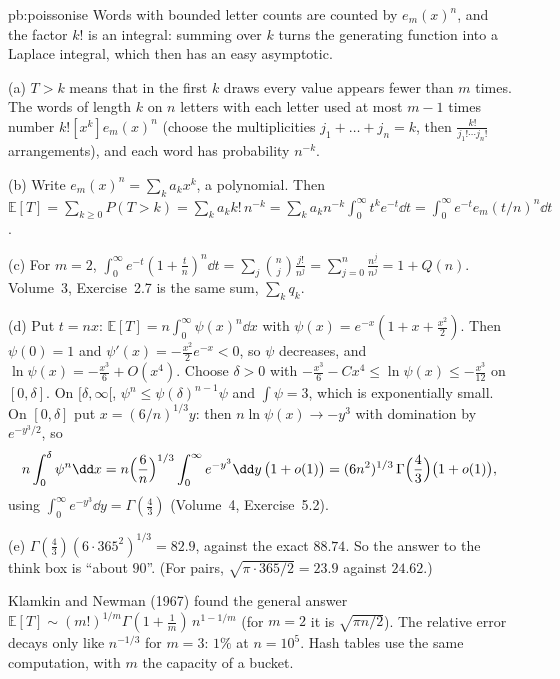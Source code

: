 \begin{solution}{pb:poissonise}
\idea Words with bounded letter counts are counted by $e_m(x)^n$, and the factor $k!$ is an integral: summing over $k$ turns the generating function into a Laplace
integral, which then has an easy asymptotic.

\writeup (a) $T>k$ means that in the first $k$ draws every value appears fewer than $m$ times. The words of length $k$ on $n$ letters with each letter used at most $m-1$
times number $k![x^k]e_m(x)^n$ (choose the multiplicities $j_1+\dots+j_n=k$, then $\frac{k!}{j_1!\cdots j_n!}$ arrangements), and each word has probability $n^{-k}$.

(b) Write $e_m(x)^n=\sum_ka_kx^k$, a polynomial. Then $\mathbb E[T]=\sum_{k\ge0}P(T>k)=\sum_ka_kk!\,n^{-k}=\sum_ka_kn^{-k}\int_0^\infty t^ke^{-t}\dd t=\int_0^\infty e^{-t}e_m(t/n)^n\dd t$.

(c) For $m=2$, $\int_0^\infty e^{-t}(1+\frac tn)^n\dd t=\sum_j\binom nj\frac{j!}{n^j}=\sum_{j=0}^n\frac{n^{\underline j}}{n^j}=1+Q(n)$. Volume~3, Exercise~2.7 is the same sum, $\sum_kq_k$.

(d) Put $t=nx$: $\mathbb E[T]=n\int_0^\infty\psi(x)^n\dd x$ with $\psi(x)=e^{-x}(1+x+\frac{x^2}2)$. Then $\psi(0)=1$ and $\psi'(x)=-\frac{x^2}2e^{-x}<0$, so $\psi$ decreases, and
$\ln\psi(x)=-\frac{x^3}6+O(x^4)$. Choose $\delta>0$ with $-\frac{x^3}6-Cx^4\le\ln\psi(x)\le-\frac{x^3}{12}$ on $[0,\delta]$. On $[\delta,\infty[$, $\psi^n\le\psi(\delta)^{n-1}\psi$ and $\int\psi=3$, which is exponentially
small. On $[0,\delta]$ put $x=(6/n)^{1/3}y$: then $n\ln\psi(x)\to-y^3$ with domination by $e^{-y^3/2}$, so
\[
n\int_0^\delta\psi^n\dd x=n\Bigl(\frac6n\Bigr)^{1/3}\int_0^\infty e^{-y^3}\dd y\,\bigl(1+o(1)\bigr)=(6n^2)^{1/3}\,\Gamma\Bigl(\frac43\Bigr)\bigl(1+o(1)\bigr),
\]
using $\int_0^\infty e^{-y^3}\dd y=\Gamma(\frac43)$ (Volume~4, Exercise~5.2).

(e) $\Gamma(\frac43)(6\cdot365^2)^{1/3}=82.9$, against the exact $88.74$. So the answer to the think box is ``about $90$''. (For pairs, $\sqrt{\pi\cdot365/2}=23.9$ against $24.62$.)

\leads Klamkin and Newman (1967) found the general answer $\mathbb E[T]\sim(m!)^{1/m}\Gamma(1+\frac1m)\,n^{1-1/m}$ (for $m=2$ it is $\sqrt{\pi n/2}$). The relative error
decays only like $n^{-1/3}$ for $m=3$: $1\%$ at $n=10^5$. Hash tables use the same computation, with $m$ the capacity of a bucket.
\end{solution}

